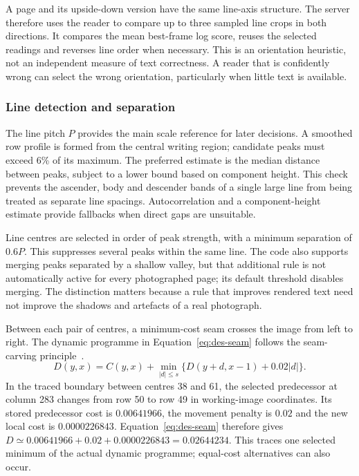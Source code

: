 A page and its upside-down version have the same line-axis structure. The server therefore uses the reader to compare up to three sampled line crops in both directions. It compares the mean best-frame log score, reuses the selected readings and reverses line order when necessary. This is an orientation heuristic, not an independent measure of text correctness. A reader that is confidently wrong can select the wrong orientation, particularly when little text is available.

\subsubsection{Line detection and separation}
The line pitch $P$ provides the main scale reference for later decisions. A smoothed row profile is formed from the central writing region; candidate peaks must exceed 6\% of its maximum. The preferred estimate is the median distance between peaks, subject to a lower bound based on component height. This check prevents the ascender, body and descender bands of a single large line from being treated as separate line spacings. Autocorrelation and a component-height estimate provide fallbacks when direct gaps are unsuitable.

Line centres are selected in order of peak strength, with a minimum separation of $0.6P$. This suppresses several peaks within the same line. The code also supports merging peaks separated by a shallow valley, but that additional rule is not automatically active for every photographed page; its default threshold disables merging. The distinction matters because a rule that improves rendered text need not improve the shadows and artefacts of a real photograph.

Between each pair of centres, a minimum-cost seam crosses the image from left to right. The dynamic programme in Equation~\ref{eq:des-seam} follows the seam-carving principle~\cite[p.~3]{avidan2007}.
\begin{equation}
D(y,x)=C(y,x)+\min_{|d|\leq s}
\{D(y+d,x-1)+0.02|d|\}.
\label{eq:des-seam}
\end{equation}
In the traced boundary between centres 38 and 61, the selected predecessor at column 283 changes from row 50 to row 49 in working-image coordinates. Its stored predecessor cost is $0.00641966$, the movement penalty is $0.02$ and the new local cost is $0.0000226843$. Equation~\ref{eq:des-seam} therefore gives $D\simeq0.00641966+0.02+0.0000226843=0.02644234$. This traces one selected minimum of the actual dynamic programme; equal-cost alternatives can also occur.

